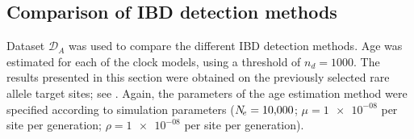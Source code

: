 %
\subsection{Comparison of IBD detection methods}\label{sec:compare_ibd_methods}
%

Dataset $\mathcal{D}_A$ was used to compare the different IBD detection methods.
Age was estimated for each of the  clock models, using a threshold of ${n_d=\num{1000}}$.
The results presented in this section were obtained on the previously selected  rare allele target sites; see .
Again, the parameters of the age estimation method were specified according to simulation parameters (${N_{\!e}=\num{10000}}$; ${\mu=\num[round-precision=1]{1e-08}}$ per site per generation; ${\rho=\num[round-precision=1]{1e-08}}$ per site per generation).








